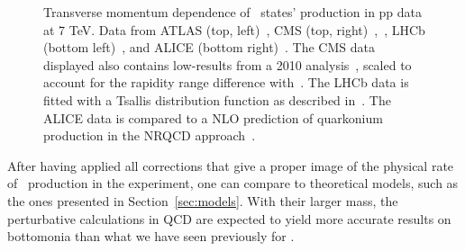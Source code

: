 \begin{figure}[h]
\begin{center}
  \caption{Transverse momentum dependence of \PgU~states' production
    in pp data at 7 TeV. Data from ATLAS (top, left)~\cite{atlasUpsilon7tev}, CMS (top,
    right)~\cite{cmsUpsi1},~\cite{cmsUpsi2}, LHCb (bottom left)~\cite{lhcbUpsi1fb}, and ALICE (bottom right)~\cite{aliceUpsi_pp}. The
    CMS data displayed also contains low-\pt results from a 2010
    analysis~\cite{cmsUpsi1}, scaled to account for the
    rapidity range difference with~\cite{cmsUpsi2}. The LHCb data is
    fitted with a Tsallis distribution function as described
    in~\cite{lhcbUpsi1fb}. The ALICE data is compared to a NLO
    prediction of quarkonium production in the NRQCD approach~\cite{nrqcdupsilon}.}
  \label{fig:upsispectrapp}
\end{center}
\end{figure}



After having applied all corrections that give a proper image of the
physical rate of \PgU~production in the experiment, one can compare to
theoretical models, such as the ones presented in Section~\ref{sec:models}.
With their larger mass, the perturbative calculations in QCD are
expected to yield more accurate results on bottomonia than what we have seen previously
for \Jpsi. 

